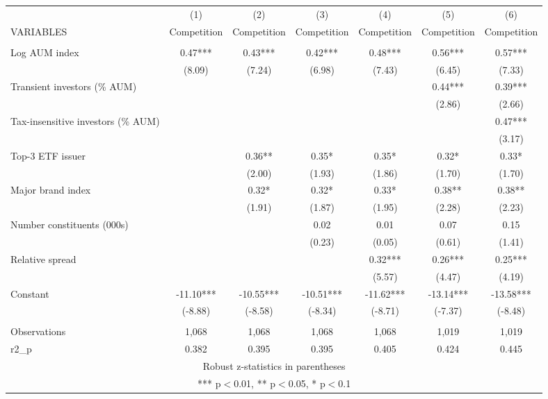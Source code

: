 \documentclass[]{article}
\begin{document}
\begin{tabular}{lcccccc} \hline
 & (1) & (2) & (3) & (4) & (5) & (6) \\
VARIABLES & Competition & Competition & Competition & Competition & Competition & Competition \\ \hline
 &  &  &  &  &  &  \\
Log AUM index & 0.47*** & 0.43*** & 0.42*** & 0.48*** & 0.56*** & 0.57*** \\
 & (8.09) & (7.24) & (6.98) & (7.43) & (6.45) & (7.33) \\
Transient investors (\% AUM) &  &  &  &  & 0.44*** & 0.39*** \\
 &  &  &  &  & (2.86) & (2.66) \\
Tax-insensitive investors (\% AUM) &  &  &  &  &  & 0.47*** \\
 &  &  &  &  &  & (3.17) \\
Top-3 ETF issuer &  & 0.36** & 0.35* & 0.35* & 0.32* & 0.33* \\
 &  & (2.00) & (1.93) & (1.86) & (1.70) & (1.70) \\
Major brand index &  & 0.32* & 0.32* & 0.33* & 0.38** & 0.38** \\
 &  & (1.91) & (1.87) & (1.95) & (2.28) & (2.23) \\
Number constituents (000s) &  &  & 0.02 & 0.01 & 0.07 & 0.15 \\
 &  &  & (0.23) & (0.05) & (0.61) & (1.41) \\
Relative spread &  &  &  & 0.32*** & 0.26*** & 0.25*** \\
 &  &  &  & (5.57) & (4.47) & (4.19) \\
Constant & -11.10*** & -10.55*** & -10.51*** & -11.62*** & -13.14*** & -13.58*** \\
 & (-8.88) & (-8.58) & (-8.34) & (-8.71) & (-7.37) & (-8.48) \\
 &  &  &  &  &  &  \\
Observations & 1,068 & 1,068 & 1,068 & 1,068 & 1,019 & 1,019 \\
 r2\_p & 0.382 & 0.395 & 0.395 & 0.405 & 0.424 & 0.445 \\ \hline
\multicolumn{7}{c}{ Robust z-statistics in parentheses} \\
\multicolumn{7}{c}{ *** p$<$0.01, ** p$<$0.05, * p$<$0.1} \\
\end{tabular}
\end{document}
